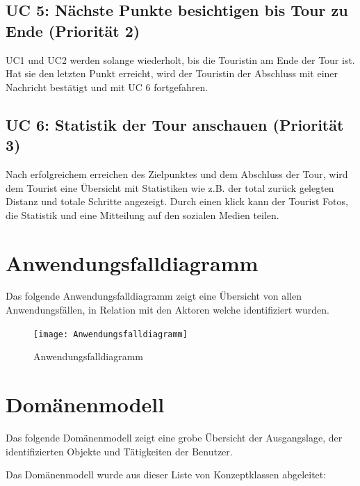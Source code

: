 \documentclass[a4paper,10pt,xetex]{article}
\begin{document}
\subsection{UC 5: Nächste Punkte besichtigen bis Tour zu Ende (Priorität 2)}\label{uc-5-user-besucht-nuxe4chste-punkte-bis-tour-zu-ende.-priorituxe4t-2}
UC1 und UC2 werden solange wiederholt, bis die Touristin am Ende der Tour
ist. Hat sie den letzten Punkt erreicht, wird der Touristin der Abschluss
mit einer Nachricht bestätigt und mit UC 6 fortgefahren.


\subsection{UC 6: Statistik der Tour anschauen (Priorität 3)}\label{uc-6-user-sieht-statistik-der-tour.-priorituxe4t-3}
Nach erfolgreichem erreichen des Zielpunktes und dem Abschluss der Tour,
wird dem Tourist eine Übersicht mit Statistiken wie z.B. der total
zurück gelegten Distanz und totale Schritte angezeigt. Durch einen klick
kann der Tourist Fotos, die Statistik und eine Mitteilung auf den
sozialen Medien teilen.


\section{Anwendungsfalldiagramm}\label{anwendungsfalldiagramm}
Das folgende Anwendungsfalldiagramm zeigt eine Übersicht von allen Anwendungsfällen, in Relation mit den Aktoren welche identifiziert wurden.

\begin{figure}
  \centering
  \texttt{[image: Anwendungsfalldiagramm]}
  \caption{Anwendungsfalldiagramm}
\end{figure}


\section{Domänenmodell}\label{domaenenmodell}
Das folgende Domänenmodell zeigt eine grobe Übersicht der Ausgangslage,
der identifizierten Objekte und Tätigkeiten der Benutzer.

Das Domänenmodell wurde aus dieser Liste von Konzeptklassen abgeleitet:
\end{document}
